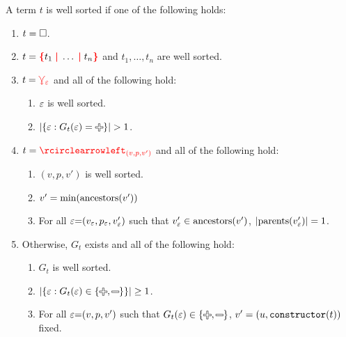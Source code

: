 \begin{definition}
  A term $t$ is well sorted if one of the following holds:
  \begin{enumerate}
    \item $t = \square$.
    \item $t = \conflictHole{t_1, \ldots, t_n}$ and $t_1, \ldots, t_n$ are well sorted.
    \item $t = \textcolor{red}{\curlyveedownarrow_{\varepsilon}}$ and all of the following hold:
      \begin{enumerate}
        \item $\varepsilon$ is well sorted.
        \item
          $\SizeOf{\SetOf{\e \SuchThat{G_t(\e) = \Plus}}} > 1$.
      \end{enumerate}
    \item $t = \cycleVertex{(v, p, v')}$ and all of the following hold:
      \begin{enumerate}
        \item $(v, p, v')$ is well sorted.
        \item $v' = \operatorname{\text{min}}\mathopen{}\left(\operatorname{\text{ancestors}}\mathopen{}\left(v'\right)\mathclose{}\right)\mathclose{}$
        \item
          For all $\varepsilon{=}(v_{\varepsilon}, p_{\varepsilon}, v_{\varepsilon}')$
          such that $v_{\varepsilon}' \in \operatorname{\text{ancestors}}\mathopen{}\left(v'\right)\mathclose{}$,
          $\left\lvert\operatorname{\text{parents}}\mathopen{}\left(v_{\varepsilon}'\right)\mathclose{}\right\rvert = 1$.
      \end{enumerate}
    \item Otherwise, $G_t$ exists and all of the following hold:
    \begin{enumerate}
      \item
      $G_t$ is well sorted.
      \item
      $\SizeOf{\SetOf{\e \SuchThat{G_t(\e) \in \SetOf{\Plus, \Minus}}}} \geq 1$.
    \item
      For all $\varepsilon{=}(v, p, v')$ such that $G_t(\e) \in \SetOf{\Plus, \Minus}$,
      $v' = (u, \operatorname{\texttt{constructor}}\mathopen{}\left(t\right)\mathclose{})$ fixed.
    \end{enumerate}
  \end{enumerate}
\end{definition}

